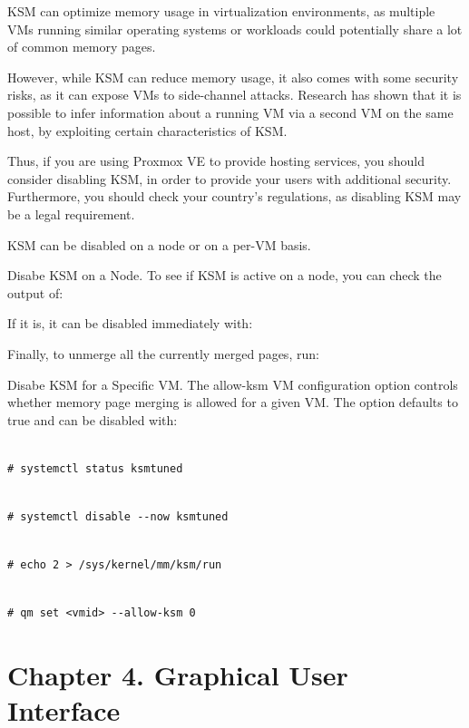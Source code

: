 KSM can optimize memory usage in virtualization environments, as multiple VMs running similar operating systems or workloads could potentially share a lot of common memory pages.

However, while KSM can reduce memory usage, it also comes with some security risks, as it can expose VMs to side-channel attacks. Research has shown that it is possible to infer information about a running VM via a second VM on the same host, by exploiting certain characteristics of KSM.

Thus, if you are using Proxmox VE to provide hosting services, you should consider disabling KSM, in order to provide your users with additional security. Furthermore, you should check your country’s regulations, as disabling KSM may be a legal requirement.

KSM can be disabled on a node or on a per-VM basis.

Disabe KSM on a Node. To see if KSM is active on a node, you can check the output of:

If it is, it can be disabled immediately with:

Finally, to unmerge all the currently merged pages, run:

Disabe KSM for a Specific VM. The allow-ksm VM configuration option controls whether memory page merging is allowed for a given VM. The option defaults to true and can be disabled with:

\begin{lstlisting}

# systemctl status ksmtuned

\end{lstlisting}

\begin{lstlisting}

# systemctl disable --now ksmtuned

\end{lstlisting}

\begin{lstlisting}

# echo 2 > /sys/kernel/mm/ksm/run

\end{lstlisting}

\begin{lstlisting}

# qm set <vmid> --allow-ksm 0

\end{lstlisting}


\section{Chapter 4. Graphical User Interface}

